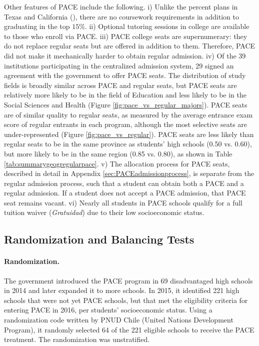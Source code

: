 Other features of PACE include the following. i) Unlike the percent plans in Texas and California (\citealp{horn_2105}), there are no coursework requirements in addition to graduating in the top $15\%$. ii) Optional tutoring sessions in college are available to those who enroll via PACE. iii) PACE college seats are supernumerary: they do not replace regular seats but are offered in addition to them. Therefore, PACE did not make it mechanically harder to obtain regular admission. iv) Of the 39 institutions participating in the centralized admission system, 29 signed an agreement with the government to offer PACE seats. The distribution of study fields is broadly similar across PACE and regular seats, but PACE seats are relatively more likely to be  in the field of Education and less likely to be in the Social Sciences and Health (Figure \ref{fig:pace_vs_regular_majors}). PACE seats are of similar quality to regular seats, as measured by the average entrance exam score of regular entrants in each program, although the most selective seats are under-represented (Figure \ref{fig:pace_vs_regular}). PACE seats are less likely than regular seats to be in the same province as students' high schools (0.50 vs. 0.60), but more likely to be in the same region (0.85 vs. 0.80), as shown in Table \ref{tab:summarygeogregularpace}. v) The allocation process for PACE seats, described in detail in Appendix \ref{sec:PACEadmissionprocess}, is separate from the regular admission process, such that a student can obtain both a PACE and a regular admission. If a student does not accept a PACE admission, that PACE seat remains vacant. vi) Nearly all students in PACE schools qualify for a full tuition waiver ({\itshape Gratuidad}) due to their low socioeconomic status. 



\subsection{Randomization and Balancing Tests}\label{sec:pol_random}

\paragraph{Randomization.} The government introduced the PACE program in 69 disadvantaged high schools in 2014 and later expanded it to more schools. In 2015, it identified 221 high schools that were not yet PACE schools, but that met the eligibility criteria for entering PACE in 2016, per students' socioeconomic status. Using a randomization code written by PNUD Chile (United Nations Development Program), it randomly selected 64 of the 221 eligible schools to receive the PACE treatment. The randomization was unstratified.\par





